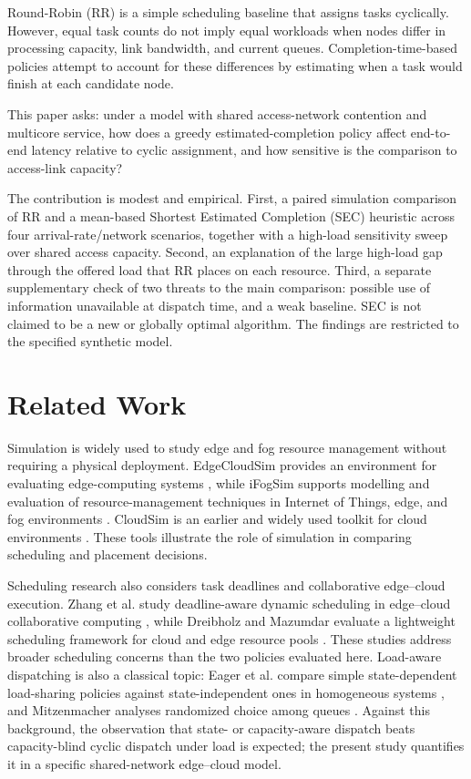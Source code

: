 \documentclass[conference]{IEEEtran}
\begin{document}
Round-Robin (RR) is a simple scheduling baseline that assigns tasks cyclically. However, equal task counts do not imply equal workloads when nodes differ in processing capacity, link bandwidth, and current queues. Completion-time-based policies attempt to account for these differences by estimating when a task would finish at each candidate node.

This paper asks: under a model with shared access-network contention and multicore service, how does a greedy estimated-completion policy affect end-to-end latency relative to cyclic assignment, and how sensitive is the comparison to access-link capacity?

The contribution is modest and empirical. First, a paired simulation comparison of RR and a mean-based Shortest Estimated Completion (SEC) heuristic across four arrival-rate/network scenarios, together with a high-load sensitivity sweep over shared access capacity. Second, an explanation of the large high-load gap through the offered load that RR places on each resource. Third, a separate supplementary check of two threats to the main comparison: possible use of information unavailable at dispatch time, and a weak baseline. SEC is not claimed to be a new or globally optimal algorithm. The findings are restricted to the specified synthetic model.

\section{Related Work}
Simulation is widely used to study edge and fog resource management without requiring a physical deployment. EdgeCloudSim provides an environment for evaluating edge-computing systems \cite{sonmez2018}, while iFogSim supports modelling and evaluation of resource-management techniques in Internet of Things, edge, and fog environments \cite{gupta2017}. CloudSim is an earlier and widely used toolkit for cloud environments \cite{calheiros2011}. These tools illustrate the role of simulation in comparing scheduling and placement decisions.

Scheduling research also considers task deadlines and collaborative edge--cloud execution. Zhang et al. study deadline-aware dynamic scheduling in edge--cloud collaborative computing \cite{zhang2022}, while Dreibholz and Mazumdar evaluate a lightweight scheduling framework for cloud and edge resource pools \cite{dreibholz2023}. These studies address broader scheduling concerns than the two policies evaluated here. Load-aware dispatching is also a classical topic: Eager et al. compare simple state-dependent load-sharing policies against state-independent ones in homogeneous systems \cite{eager1986}, and Mitzenmacher analyses randomized choice among queues \cite{mitzenmacher2001}. Against this background, the observation that state- or capacity-aware dispatch beats capacity-blind cyclic dispatch under load is expected; the present study quantifies it in a specific shared-network edge--cloud model.
\end{document}
